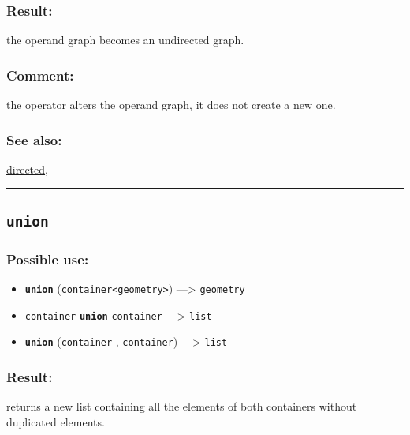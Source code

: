 \documentclass[]{book}
\providecommand{\tightlist}{%
  \setlength{\itemsep}{0pt}\setlength{\parskip}{0pt}}
\theoremstyle{definition}
\theoremstyle{definition}
\theoremstyle{definition}
\theoremstyle{remark}
\begin{document}
\subsubsection{Result:}\label{result-518}

the operand graph becomes an undirected graph.

\subsubsection{Comment:}\label{comment-102}

the operator alters the operand graph, it does not create a new one.

\subsubsection{See also:}\label{see-also-213}

\href{operators-d-to-h.html\#directed}{directed},

\begin{center}\rule{0.5\linewidth}{\linethickness}\end{center}

\subsection{\texorpdfstring{\texttt{union}}{union}}\label{union}

\subsubsection{Possible use:}\label{possible-use-538}

\begin{itemize}
\tightlist
\item
  \textbf{\texttt{union}}
  (\texttt{container\textless{}geometry\textgreater{}})
  ---\textgreater{} \texttt{geometry}
\item
  \texttt{container} \textbf{\texttt{union}} \texttt{container}
  ---\textgreater{} \texttt{list}
\item
  \textbf{\texttt{union}} (\texttt{container} , \texttt{container})
  ---\textgreater{} \texttt{list}
\end{itemize}

\subsubsection{Result:}\label{result-519}

returns a new list containing all the elements of both containers
without duplicated elements.
\end{document}
